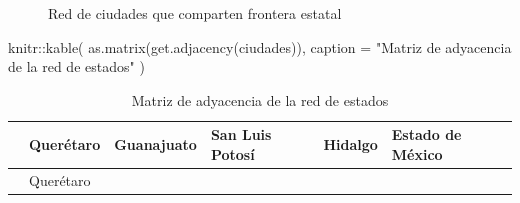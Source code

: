 \documentclass[
  letterpaper,
  DIV=11,
  numbers=noendperiod]{scrreprt}
\newenvironment{Shaded}{\begin{snugshade}}{\end{snugshade}}
\newcommand{\AttributeTok}[1]{\textcolor[rgb]{0.40,0.45,0.13}{#1}}
\newcommand{\FunctionTok}[1]{\textcolor[rgb]{0.28,0.35,0.67}{#1}}
\newcommand{\NormalTok}[1]{\textcolor[rgb]{0.00,0.23,0.31}{#1}}
\newcommand{\SpecialCharTok}[1]{\textcolor[rgb]{0.37,0.37,0.37}{#1}}
\newcommand{\StringTok}[1]{\textcolor[rgb]{0.13,0.47,0.30}{#1}}
\begin{document}
\begin{tcolorbox}
\begin{figure}[H]
\caption{\label{fig-ej-resuelto-2}Red de ciudades que comparten frontera
estatal}

\end{figure}%

\begin{Shaded}
\begin{Highlighting}[]
\NormalTok{knitr}\SpecialCharTok{::}\FunctionTok{kable}\NormalTok{(}
  \FunctionTok{as.matrix}\NormalTok{(}\FunctionTok{get.adjacency}\NormalTok{(ciudades)),}
  \AttributeTok{caption =} \StringTok{"Matriz de adyacencia de la red de estados"}
\NormalTok{)}
\end{Highlighting}
\end{Shaded}

\begin{longtable}[]{@{}
  >{\raggedright\arraybackslash}p{}
  >{\raggedleft\arraybackslash}p{}
  >{\raggedleft\arraybackslash}p{}
  >{\raggedleft\arraybackslash}p{}
  >{\raggedleft\arraybackslash}p{}
  >{\raggedleft\arraybackslash}p{}@{}}
\caption{Matriz de adyacencia de la red de estados}\tabularnewline
\toprule\noalign{}
\begin{minipage}[b]{\linewidth}\raggedright
\end{minipage} & \begin{minipage}[b]{\linewidth}\raggedleft
Querétaro
\end{minipage} & \begin{minipage}[b]{\linewidth}\raggedleft
Guanajuato
\end{minipage} & \begin{minipage}[b]{\linewidth}\raggedleft
San Luis Potosí
\end{minipage} & \begin{minipage}[b]{\linewidth}\raggedleft
Hidalgo
\end{minipage} & \begin{minipage}[b]{\linewidth}\raggedleft
Estado de México
\end{minipage} \\
\midrule\noalign{}
\endfirsthead
\toprule\noalign{}
\begin{minipage}[b]{\linewidth}\raggedright
\end{minipage} & \begin{minipage}[b]{\linewidth}\raggedleft
Querétaro
\end{minipage} & \begin{minipage}[b]{\linewidth}\raggedleft

\end{minipage}
\end{longtable}
\end{tcolorbox}
\end{document}
